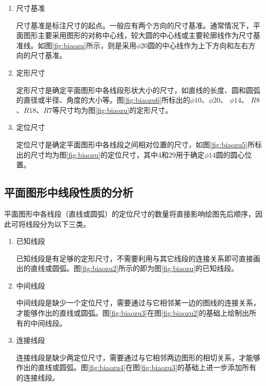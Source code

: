 \begin{enumerate}
\item 尺寸基准

尺寸基准是标注尺寸的起点。一般应有两个方向的尺寸基准。通常情况下，平面图形主要采用图形的对称中心线，较大圆的中心线或主要轮廓线作为尺寸基准线。如图\ref{fig:biaozu}所示，则是采用$\phi 20$圆的中心线作为上下方向和左右方向的尺寸基准。

\item 定形尺寸

定形尺寸是确定平面图形中各线段形状大小的尺寸，如直线的长度、圆和圆弧的直径或半径、角度的大小等。图\ref{fig:biaozu6}所标出的$\phi 10$、$\phi 20$、 $\phi 14$、 $R8$、$R18$、$R7$等尺寸均为图\ref{fig:biaozu}的定形尺寸。

\noindent
\begin{figure}[htbp]
\centering
\begin{floatrow}
\end{floatrow}
\end{figure}
\indent

\item 定位尺寸

定位尺寸是确定平面图形中各线段之间相对位置的尺寸，如图\ref{fig:biaozu5}所标出的尺寸均为图\ref{fig:biaozu}的定位尺寸，其中4和29用于确定$\phi 14$圆的圆心位置。

\end{enumerate}
\subsection{平面图形中线段性质的分析}
平面图形中各线段（直线或圆弧）的定位尺寸的数量将直接影响绘图先后顺序，因此可将线段分为以下三类。

\begin{enumerate}
\item 已知线段

已知线段是有足够的定形尺寸，不需要利用与其它线段的连接关系即可直接画出的直线或圆弧。图\ref{fig:biaozu2}所示的即为图\ref{fig:biaozu}的已知线段。

\item 中间线段

中间线段是缺少一个定位尺寸，需要通过与它相邻某一边的图线的连接关系，才能够作出的直线或圆弧。图\ref{fig:biaozu3}在图\ref{fig:biaozu2}的基础上绘制出所有的中间线段。
\item 连接线段

连接线段是缺少两定位尺寸，需要通过与它相邻两边图形的相切关系，才能够作出的直线或圆弧。图\ref{fig:biaozu4}在图\ref{fig:biaozu3}的基础上进一步添加所有的连接线段。
\end{enumerate}

